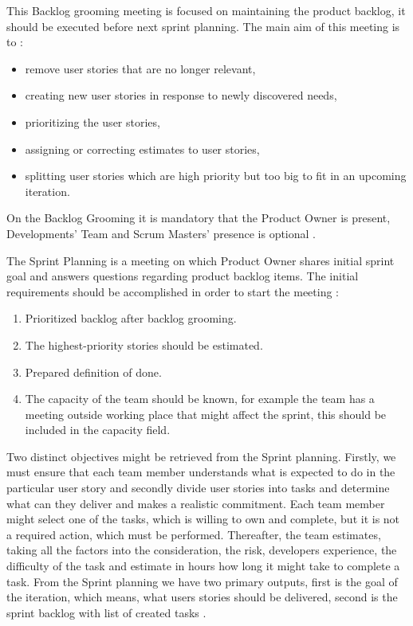 This Backlog grooming meeting is focused on maintaining the product backlog, it should be executed before next sprint planning. The main aim of this meeting is to \cite{ScrumBook2}:

\begin{itemize}
    \item remove user stories that are no longer relevant,
    \item creating new user stories in response to newly discovered needs,
    \item prioritizing the user stories, 
    \item assigning or correcting estimates to user stories,
    \item splitting user stories which are high priority but too big to fit in an upcoming iteration.
\end{itemize} 

On the Backlog Grooming it is mandatory that the Product Owner is present, Developments' Team and Scrum Masters' presence is optional \cite{ScrumBook}.

The Sprint Planning is a meeting on which Product Owner shares initial sprint goal and answers questions regarding product backlog items. The initial requirements should be accomplished in order to start the meeting \cite{IntroToScrumBook}:
\begin{enumerate}
    \item Prioritized backlog after backlog grooming.
    \item The highest-priority stories should be estimated.
    \item Prepared definition of done.
    \item The capacity of the team should be known, for example the team has a meeting outside working place that might affect the sprint, this should be included in the capacity field.
\end{enumerate}
Two distinct objectives might be retrieved from the Sprint planning. Firstly, we must ensure that each team member understands what is expected to do in the particular user story and secondly divide user stories into tasks and determine what can they deliver and makes a realistic commitment. Each team member might select one of the tasks, which is willing to own and complete, but it is not a required action, which must be performed. Thereafter, the team estimates, taking all the factors into the consideration, the risk, developers experience, the difficulty of the task and estimate in hours how long it might take to complete a task. From the Sprint planning we have two primary outputs, first is the goal of the iteration, which means, what users stories should be delivered, second is the sprint backlog with list of created tasks \cite{ScrumBook, IntroToScrumBook}. 

